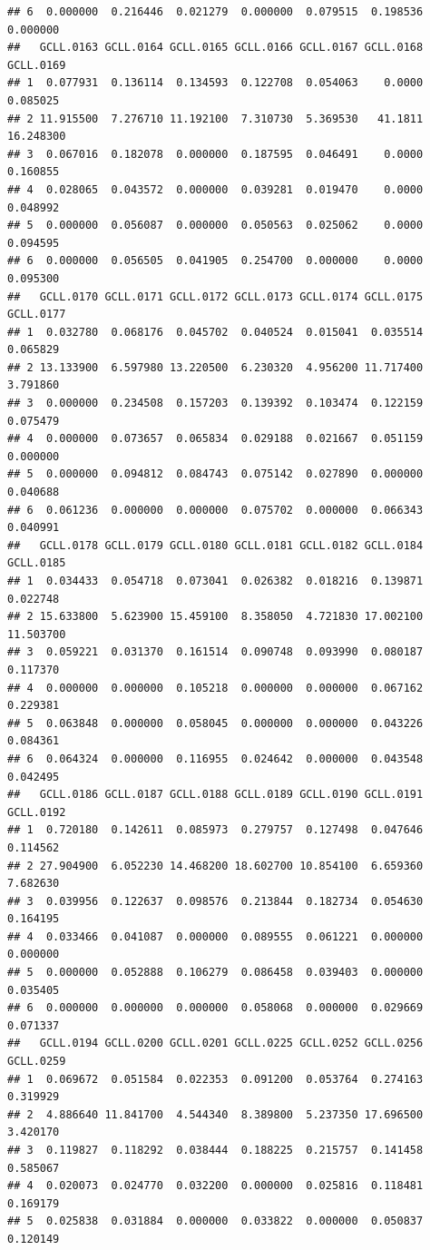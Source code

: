 \documentclass[
]{article}
\begin{document}
\begin{verbatim}
## 6  0.000000  0.216446  0.021279  0.000000  0.079515  0.198536  0.000000
##   GCLL.0163 GCLL.0164 GCLL.0165 GCLL.0166 GCLL.0167 GCLL.0168 GCLL.0169
## 1  0.077931  0.136114  0.134593  0.122708  0.054063    0.0000  0.085025
## 2 11.915500  7.276710 11.192100  7.310730  5.369530   41.1811 16.248300
## 3  0.067016  0.182078  0.000000  0.187595  0.046491    0.0000  0.160855
## 4  0.028065  0.043572  0.000000  0.039281  0.019470    0.0000  0.048992
## 5  0.000000  0.056087  0.000000  0.050563  0.025062    0.0000  0.094595
## 6  0.000000  0.056505  0.041905  0.254700  0.000000    0.0000  0.095300
##   GCLL.0170 GCLL.0171 GCLL.0172 GCLL.0173 GCLL.0174 GCLL.0175 GCLL.0177
## 1  0.032780  0.068176  0.045702  0.040524  0.015041  0.035514  0.065829
## 2 13.133900  6.597980 13.220500  6.230320  4.956200 11.717400  3.791860
## 3  0.000000  0.234508  0.157203  0.139392  0.103474  0.122159  0.075479
## 4  0.000000  0.073657  0.065834  0.029188  0.021667  0.051159  0.000000
## 5  0.000000  0.094812  0.084743  0.075142  0.027890  0.000000  0.040688
## 6  0.061236  0.000000  0.000000  0.075702  0.000000  0.066343  0.040991
##   GCLL.0178 GCLL.0179 GCLL.0180 GCLL.0181 GCLL.0182 GCLL.0184 GCLL.0185
## 1  0.034433  0.054718  0.073041  0.026382  0.018216  0.139871  0.022748
## 2 15.633800  5.623900 15.459100  8.358050  4.721830 17.002100 11.503700
## 3  0.059221  0.031370  0.161514  0.090748  0.093990  0.080187  0.117370
## 4  0.000000  0.000000  0.105218  0.000000  0.000000  0.067162  0.229381
## 5  0.063848  0.000000  0.058045  0.000000  0.000000  0.043226  0.084361
## 6  0.064324  0.000000  0.116955  0.024642  0.000000  0.043548  0.042495
##   GCLL.0186 GCLL.0187 GCLL.0188 GCLL.0189 GCLL.0190 GCLL.0191 GCLL.0192
## 1  0.720180  0.142611  0.085973  0.279757  0.127498  0.047646  0.114562
## 2 27.904900  6.052230 14.468200 18.602700 10.854100  6.659360  7.682630
## 3  0.039956  0.122637  0.098576  0.213844  0.182734  0.054630  0.164195
## 4  0.033466  0.041087  0.000000  0.089555  0.061221  0.000000  0.000000
## 5  0.000000  0.052888  0.106279  0.086458  0.039403  0.000000  0.035405
## 6  0.000000  0.000000  0.000000  0.058068  0.000000  0.029669  0.071337
##   GCLL.0194 GCLL.0200 GCLL.0201 GCLL.0225 GCLL.0252 GCLL.0256 GCLL.0259
## 1  0.069672  0.051584  0.022353  0.091200  0.053764  0.274163  0.319929
## 2  4.886640 11.841700  4.544340  8.389800  5.237350 17.696500  3.420170
## 3  0.119827  0.118292  0.038444  0.188225  0.215757  0.141458  0.585067
## 4  0.020073  0.024770  0.032200  0.000000  0.025816  0.118481  0.169179
## 5  0.025838  0.031884  0.000000  0.033822  0.000000  0.050837  0.120149

\end{verbatim}
\end{document}
